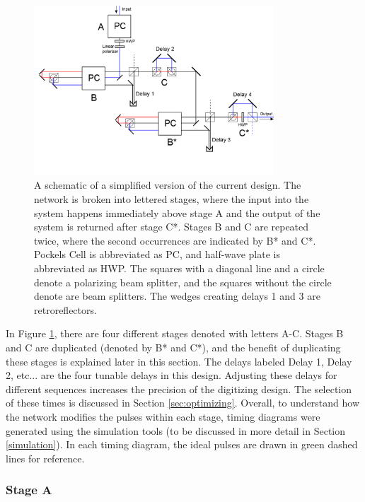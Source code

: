 \documentclass[pdftex,12pt,a4paper]{article}
\begin{document}
\begin{figure}[H]
\centering
\includegraphics[width=0.8\textwidth]{digitizing.png}
\caption{A schematic of a simplified version of the current design. The network is broken into lettered stages, where the input into the system happens immediately above stage A and the output of the system is returned after stage C*. Stages B and C are repeated twice, where the second occurrences are indicated by B* and C*. Pockels Cell is abbreviated as PC, and half-wave plate is abbreviated as HWP. The squares with a diagonal line and a circle denote a polarizing beam splitter, and the squares without the circle denote are beam splitters. The wedges creating delays 1 and 3 are retroreflectors.  }
\label{fig:digitizing}
\end{figure}

In Figure \ref{fig:digitizing}, there are four different stages denoted with letters A-C. Stages B and C are duplicated (denoted by B* and C*), and the benefit of duplicating these stages is explained later in this section. The delays labeled Delay 1, Delay 2, etc... are the four tunable delays in this design. Adjusting these delays for different sequences increases the precision of the digitizing design. The selection of these times is discussed in Section \ref{sec:optimizing}. Overall, to understand how the network modifies the pulses within each stage, timing diagrams were generated using the simulation tools (to be discussed in more detail in Section \ref{simulation}). In each timing diagram, the ideal pulses are drawn in green dashed lines for reference. 

\subsubsection*{Stage A}
\end{document}
